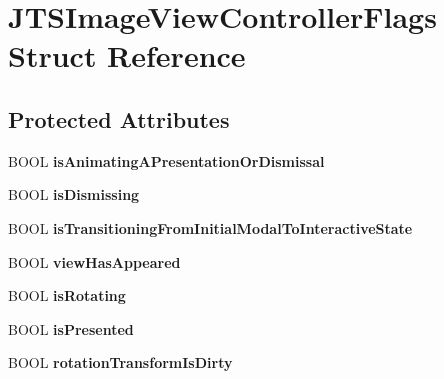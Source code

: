\hypertarget{struct_j_t_s_image_view_controller_flags}{}\section{J\+T\+S\+Image\+View\+Controller\+Flags Struct Reference}
\label{struct_j_t_s_image_view_controller_flags}
\subsection*{Protected Attributes}
\begin{DoxyCompactItemize}
\item 
\hypertarget{struct_j_t_s_image_view_controller_flags_a5a63f120dc564b0209b2f817d225ca5f}{}B\+O\+O\+L {\bfseries is\+Animating\+A\+Presentation\+Or\+Dismissal}\label{struct_j_t_s_image_view_controller_flags_a5a63f120dc564b0209b2f817d225ca5f}

\item 
\hypertarget{struct_j_t_s_image_view_controller_flags_ad41d3830787bfa174c16df79bc3792fa}{}B\+O\+O\+L {\bfseries is\+Dismissing}\label{struct_j_t_s_image_view_controller_flags_ad41d3830787bfa174c16df79bc3792fa}

\item 
\hypertarget{struct_j_t_s_image_view_controller_flags_a414285dd810daa7860a2235c014e01c9}{}B\+O\+O\+L {\bfseries is\+Transitioning\+From\+Initial\+Modal\+To\+Interactive\+State}\label{struct_j_t_s_image_view_controller_flags_a414285dd810daa7860a2235c014e01c9}

\item 
\hypertarget{struct_j_t_s_image_view_controller_flags_a84a223015addf054fecd87ebdc6b023f}{}B\+O\+O\+L {\bfseries view\+Has\+Appeared}\label{struct_j_t_s_image_view_controller_flags_a84a223015addf054fecd87ebdc6b023f}

\item 
\hypertarget{struct_j_t_s_image_view_controller_flags_a533c8f5d38e541dc132082afb120ca1b}{}B\+O\+O\+L {\bfseries is\+Rotating}\label{struct_j_t_s_image_view_controller_flags_a533c8f5d38e541dc132082afb120ca1b}

\item 
\hypertarget{struct_j_t_s_image_view_controller_flags_ac20da6486f0aaaab858745605fb0e5e6}{}B\+O\+O\+L {\bfseries is\+Presented}\label{struct_j_t_s_image_view_controller_flags_ac20da6486f0aaaab858745605fb0e5e6}

\item 
\hypertarget{struct_j_t_s_image_view_controller_flags_a9db863f485edc355824f2fc3256f64f1}{}B\+O\+O\+L {\bfseries rotation\+Transform\+Is\+Dirty}\label{struct_j_t_s_image_view_controller_flags_a9db863f485edc355824f2fc3256f64f1}


\end{DoxyCompactItemize}
